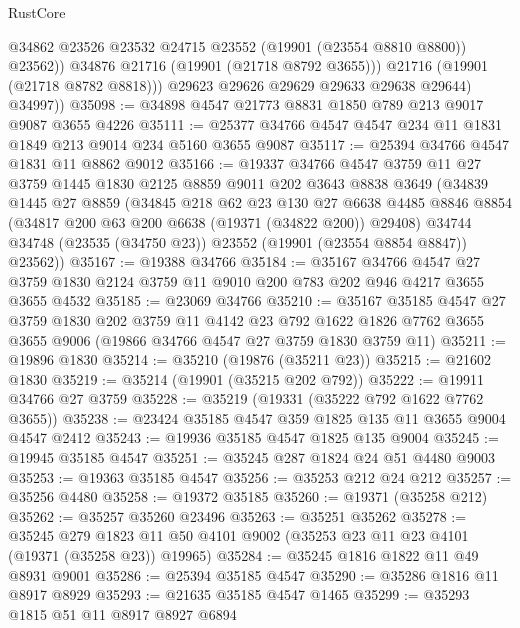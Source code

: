 \begin{lexlean}{RustCore}
\begin{coremodule}
                  @34862
                  @23526
                  @23532
                  @24715
                  @23552
                  (@19901 (@23554 @8810 @8800))
                  @23562))
              @34876
              @21716
              (@19901 (@21718 @8792 @3655)))
            @21716
            (@19901 (@21718 @8782 @8818)))
          @29623
          @29626
          @29629
          @29633
          @29638
          @29644)
        @34997))
@35098 := @34898 @4547 @21773 @8831 @1850 @789 @213 @9017 @9087 @3655 @4226
@35111 := @25377 @34766 @4547 @4547 @234 @11 @1831 @1849 @213 @9014 @234 @5160 @3655 @9087
@35117 := @25394 @34766 @4547 @1831 @11 @8862 @9012
@35166 := @19337
    @34766
    @4547
    @3759
    @11
    @27
    @3759
    @1445
    @1830
    @2125
    @8859
    @9011
    @202
    @3643
    @8838
    @3649
    (@34839
      @1445
      @27
      @8859
      (@34845
        @218
        @62
        @23
        @130
        @27
        @6638
        @4485
        @8846
        @8854
        (@34817 @200 @63 @200 @6638 (@19371 (@34822 @200)) @29408)
        @34744
        @34748
        (@23535 (@34750 @23))
        @23552
        (@19901 (@23554 @8854 @8847))
        @23562))
@35167 := @19388 @34766
@35184 := @35167
    @34766
    @4547
    @27
    @3759
    @1830
    @2124
    @3759
    @11
    @9010
    @200
    @783
    @202
    @946
    @4217
    @3655
    @3655
    @4532
@35185 := @23069 @34766
@35210 := @35167
    @35185
    @4547
    @27
    @3759
    @1830
    @202
    @3759
    @11
    @4142
    @23
    @792
    @1622
    @1826
    @7762
    @3655
    @3655
    @9006
    (@19866 @34766 @4547 @27 @3759 @1830 @3759 @11)
@35211 := @19896 @1830
@35214 := @35210 (@19876 (@35211 @23))
@35215 := @21602 @1830
@35219 := @35214 (@19901 (@35215 @202 @792))
@35222 := @19911 @34766 @27 @3759
@35228 := @35219 (@19331 (@35222 @792 @1622 @7762 @3655))
@35238 := @23424 @35185 @4547 @359 @1825 @135 @11 @3655 @9004 @4547 @2412
@35243 := @19936 @35185 @4547 @1825 @135 @9004
@35245 := @19945 @35185 @4547
@35251 := @35245 @287 @1824 @24 @51 @4480 @9003
@35253 := @19363 @35185 @4547
@35256 := @35253 @212 @24 @212
@35257 := @35256 @4480
@35258 := @19372 @35185
@35260 := @19371 (@35258 @212)
@35262 := @35257 @35260 @23496
@35263 := @35251 @35262
@35278 := @35245
    @279
    @1823
    @11
    @50
    @4101
    @9002
    (@35253 @23 @11 @23 @4101 (@19371 (@35258 @23)) @19965)
@35284 := @35245 @1816 @1822 @11 @49 @8931 @9001
@35286 := @25394 @35185 @4547
@35290 := @35286 @1816 @11 @8917 @8929
@35293 := @21635 @35185 @4547 @1465
@35299 := @35293 @1815 @51 @11 @8917 @8927 @6894

\end{coremodule}
\end{lexlean}
